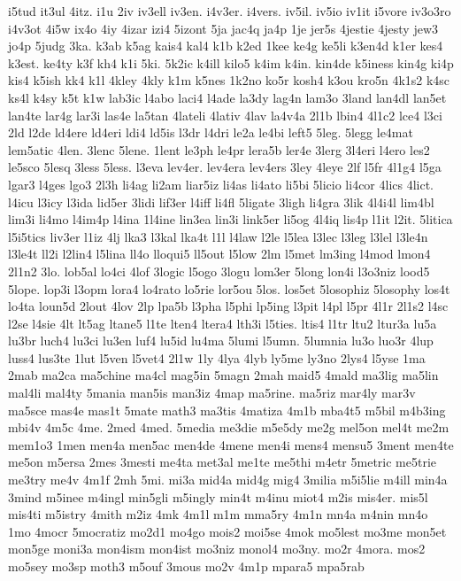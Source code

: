 {i5tud
it3ul
4itz.
i1u
2iv
iv3ell
iv3en.
i4v3er.
i4vers.
iv5il.
iv5io
iv1it
i5vore
iv3o3ro
i4v3ot
4i5w
ix4o
4iy
4izar
izi4
5izont
5ja
jac4q
ja4p
1je
jer5s
4jestie
4jesty
jew3
jo4p
5judg
3ka.
k3ab
k5ag
kais4
kal4
k1b
k2ed
1kee
ke4g
ke5li
k3en4d
k1er
kes4
k3est.
ke4ty
k3f
kh4
k1i
5ki.
5k2ic
k4ill
kilo5
k4im
k4in.
kin4de
k5iness
kin4g
ki4p
kis4
k5ish
kk4
k1l
4kley
4kly
k1m
k5nes
1k2no
ko5r
kosh4
k3ou
kro5n
4k1s2
k4sc
ks4l
k4sy
k5t
k1w
lab3ic
l4abo
laci4
l4ade
la3dy
lag4n
lam3o
3land
lan4dl
lan5et
lan4te
lar4g
lar3i
las4e
la5tan
4lateli
4lativ
4lav
la4v4a
2l1b
lbin4
4l1c2
lce4
l3ci
2ld
l2de
ld4ere
ld4eri
ldi4
ld5is
l3dr
l4dri
le2a
le4bi
left5
5leg.
5legg
le4mat
lem5atic
4len.
3lenc
5lene.
1lent
le3ph
le4pr
lera5b
ler4e
3lerg
3l4eri
l4ero
les2
le5sco
5lesq
3less
5less.
l3eva
lev4er.
lev4era
lev4ers
3ley
4leye
2lf
l5fr
4l1g4
l5ga
lgar3
l4ges
lgo3
2l3h
li4ag
li2am
liar5iz
li4as
li4ato
li5bi
5licio
li4cor
4lics
4lict.
l4icu
l3icy
l3ida
lid5er
3lidi
lif3er
l4iff
li4fl
5ligate
3ligh
li4gra
3lik
4l4i4l
lim4bl
lim3i
li4mo
l4im4p
l4ina
1l4ine
lin3ea
lin3i
link5er
li5og
4l4iq
lis4p
l1it
l2it.
5litica
l5i5tics
liv3er
l1iz
4lj
lka3
l3kal
lka4t
l1l
l4law
l2le
l5lea
l3lec
l3leg
l3lel
l3le4n
l3le4t
ll2i
l2lin4
l5lina
ll4o
lloqui5
ll5out
l5low
2lm
l5met
lm3ing
l4mod
lmon4
2l1n2
3lo.
lob5al
lo4ci
4lof
3logic
l5ogo
3logu
lom3er
5long
lon4i
l3o3niz
lood5
5lope.
lop3i
l3opm
lora4
lo4rato
lo5rie
lor5ou
5los.
los5et
5losophiz
5losophy
los4t
lo4ta
loun5d
2lout
4lov
2lp
lpa5b
l3pha
l5phi
lp5ing
l3pit
l4pl
l5pr
4l1r
2l1s2
l4sc
l2se
l4sie
4lt
lt5ag
ltane5
l1te
lten4
ltera4
lth3i
l5ties.
ltis4
l1tr
ltu2
ltur3a
lu5a
lu3br
luch4
lu3ci
lu3en
luf4
lu5id
lu4ma
5lumi
l5umn.
5lumnia
lu3o
luo3r
4lup
luss4
lus3te
1lut
l5ven
l5vet4
2l1w
1ly
4lya
4lyb
ly5me
ly3no
2lys4
l5yse
1ma
2mab
ma2ca
ma5chine
ma4cl
mag5in
5magn
2mah
maid5
4mald
ma3lig
ma5lin
mal4li
mal4ty
5mania
man5is
man3iz
4map
ma5rine.
ma5riz
mar4ly
mar3v
ma5sce
mas4e
mas1t
5mate
math3
ma3tis
4matiza
4m1b
mba4t5
m5bil
m4b3ing
mbi4v
4m5c
4me.
2med
4med.
5media
me3die
m5e5dy
me2g
mel5on
mel4t
me2m
mem1o3
1men
men4a
men5ac
men4de
4mene
men4i
mens4
mensu5
3ment
men4te
me5on
m5ersa
2mes
3mesti
me4ta
met3al
me1te
me5thi
m4etr
5metric
me5trie
me3try
me4v
4m1f
2mh
5mi.
mi3a
mid4a
mid4g
mig4
3milia
m5i5lie
m4ill
min4a
3mind
m5inee
m4ingl
min5gli
m5ingly
min4t
m4inu
miot4
m2is
mis4er.
mis5l
mis4ti
m5istry
4mith
m2iz
4mk
4m1l
m1m
mma5ry
4m1n
mn4a
m4nin
mn4o
1mo
4mocr
5mocratiz
mo2d1
mo4go
mois2
moi5se
4mok
mo5lest
mo3me
mon5et
mon5ge
moni3a
mon4ism
mon4ist
mo3niz
monol4
mo3ny.
mo2r
4mora.
mos2
mo5sey
mo3sp
moth3
m5ouf
3mous
mo2v
4m1p
mpara5
mpa5rab
}
